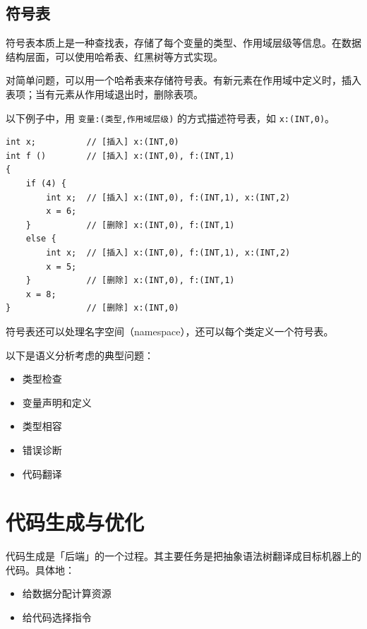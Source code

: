 \documentclass[UTF8]{ctexart}
\newcommand\Emph[1]{\textcolor{cyan!80!black}{#1}}
\begin{document}
\subsection{符号表}
\Emph{符号表}本质上是一种查找表，存储了每个变量的类型、作用域层级等信息。在数据结构层面，可以使用哈希表、红黑树等方式实现。

对简单问题，可以用一个哈希表来存储符号表。有新元素在作用域中定义时，插入表项；当有元素从作用域退出时，删除表项。

以下例子中，用 \verb!变量:(类型,作用域层级)! 的方式描述符号表，如 \verb!x:(INT,0)!。
\begin{lstlisting}
int x;          // [插入] x:(INT,0)
int f ()        // [插入] x:(INT,0), f:(INT,1)
{
    if (4) {    
        int x;  // [插入] x:(INT,0), f:(INT,1), x:(INT,2)
        x = 6;
    }           // [删除] x:(INT,0), f:(INT,1)
    else {
        int x;  // [插入] x:(INT,0), f:(INT,1), x:(INT,2)
        x = 5;
    }           // [删除] x:(INT,0), f:(INT,1)
    x = 8;      
}               // [删除] x:(INT,0)
\end{lstlisting}

符号表还可以处理名字空间（namespace），还可以每个类定义一个符号表。

以下是语义分析考虑的典型问题：
\begin{itemize}[itemsep=0pt, parsep=0pt,leftmargin=1.5cm]
  \item 类型检查
  \item 变量声明和定义
  \item 类型相容
  \item 错误诊断
  \item 代码翻译
\end{itemize}

\section{代码生成与优化}
代码生成是「后端」的一个过程。其主要任务是把\Emph{抽象语法树}翻译成\Emph{目标机器}上的代码。具体地：
\begin{itemize}[itemsep=0pt, parsep=0pt,leftmargin=1.5cm]
    \item 给数据分配计算资源
    \item 给代码选择指令
\end{itemize}
\end{document}
